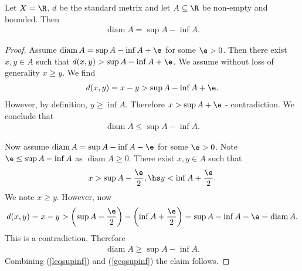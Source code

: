 \documentclass{article}
\DeclareMathOperator{\diam}{diam}
\begin{document}
\begin{claim*}[3]
	Let $X=\R$, $d$ be the standard metrix and let $A\subseteq\R$ be non-empty and bounded.
	Then
	\begin{align*}
		\diam A = \sup A - \inf A.
	\end{align*}
	\begin{proof}
		Assume $\diam A = \sup A - \inf A + \e$ for some $\e>0$. Then there exist $x,y\in A$
		such that $d(x,y) > \sup A - \inf A + \e$. We assume without loss of generality
		$x\geq y$. We find
		\begin{align*}
			d(x,y) = x - y > \sup A - \inf A + \e.
		\end{align*}
		However, by definition, $y \geq \inf A$. Therefore $x > \sup A + \e$ - contradiction.
		We conclude that
		\begin{align}
			\label{leqsupinf}
			\diam A \leq \sup A - \inf A.
		\end{align}

		Now assume $\diam A = \sup A - \inf A - \e$ for some $\e > 0$. Note $\e \leq \sup A
			- \inf A$ as $\diam A \geq 0$. There exist $x,y\in A$ such that
		\begin{align*}
			x > \sup A - \frac{\e}{2}, \hs
			y < \inf A + \frac{\e}{2}.
		\end{align*}
		We note $x\geq y$. However, now
		\begin{align*}
			d(x,y)
			= x-y
			> \left(\sup A - \frac{\e}{2}\right) - \left(\inf A + \frac{\e}{2}\right)
			= \sup A - \inf A - \e
			= \diam A.
		\end{align*}
		This is a contradiction. Therefore
		\begin{align}
			\label{geqsupinf}
			\diam A \geq \sup A - \inf A.
		\end{align}
		Combining (\ref{leqsupinf}) and (\ref{geqsupinf}) the claim follows.
	\end{proof}
\end{claim*}
\end{document}
